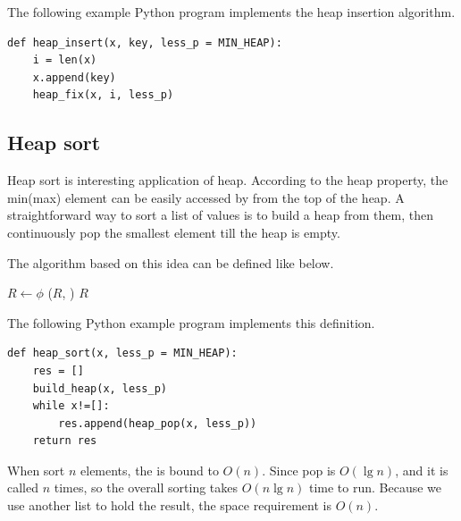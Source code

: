\documentclass[b5paper]{article}
\begin{document}
\begin{algorithmic}[1]
  \State {}
  \State {}
\EndFunction
\end{algorithmic}

The following example Python program implements the heap insertion
algorithm.

\lstset{language=Python}
\begin{lstlisting}
def heap_insert(x, key, less_p = MIN_HEAP):
    i = len(x)
    x.append(key)
    heap_fix(x, i, less_p)
\end{lstlisting}

\subsection{Heap sort}
\label{heap-sort}

Heap sort is interesting application of heap. According
to the heap property, the min(max) element can be easily accessed
by from the top of the heap. A straightforward way to sort a list
of values is to build a heap from them, then continuously
pop the smallest element till the heap is empty.

The algorithm based on this idea can be defined like below.

\begin{algorithmic}[1]
  \State $R \gets \phi$
  \State {}
    \State {}($R$, )
  \EndWhile
  \State \Return $R$
\EndFunction
\end{algorithmic}

The following Python example program implements this definition.

\lstset{language=Python}
\begin{lstlisting}
def heap_sort(x, less_p = MIN_HEAP):
    res = []
    build_heap(x, less_p)
    while x!=[]:
        res.append(heap_pop(x, less_p))
    return res
\end{lstlisting}

When sort $n$ elements, the  is bound to $O(n)$.
Since pop is $O(\lg n)$, and it
is called $n$ times, so the overall sorting takes $O(n \lg n)$
time to run. Because we use another list to hold the result,
the space requirement is $O(n)$.
\end{document}
